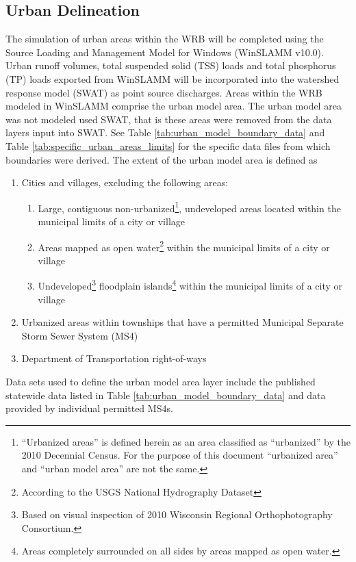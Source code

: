 \subsection{Urban Delineation}\label{sec:urban}
The simulation of urban areas within the WRB will be completed using the Source Loading and Management Model for Windows (WinSLAMM v10.0). Urban runoff volumes, total suspended solid (TSS) loads and total phosphorus (TP) loads exported from WinSLAMM will be incorporated into the watershed response model (SWAT) as point source discharges. Areas within the WRB modeled in WinSLAMM comprise the urban model area. The urban model area was not modeled used SWAT, that is these areas were removed from the data layers input into SWAT. See Table \ref{tab:urban_model_boundary_data} and Table \ref{tab:specific_urban_areas_limits} for the specific data files from which boundaries were derived. The extent of the urban model area is defined as 

\begin{enumerate}
	\item Cities and villages, excluding the following areas:
	\begin{enumerate}
		\item Large, contiguous non-urbanized\footnote{``Urbanized areas'' is defined herein as an area classified as ``urbanized'' by the 2010 Decennial Census. For the purpose of this document ``urbanized area'' and ``urban model area'' are not the same.}, undeveloped areas located within the municipal limits of a city or village
		\item Areas mapped as open water\footnote{According to the USGS National Hydrography Dataset} within the municipal limits of a city or village
		\item Undeveloped\footnote{Based on visual inspection of 2010 Wisconsin Regional Orthophotography Consortium.} floodplain islands\footnote{Areas completely surrounded on all sides by areas mapped as open water.} within the municipal limits of a city or village
	\end{enumerate}

	\item Urbanized areas within townships that have a permitted Municipal Separate Storm Sewer System (MS4)
	\item Department of Transportation right-of-ways
\end{enumerate}

Data sets used to define the urban model area layer include the published statewide data listed in Table \ref{tab:urban_model_boundary_data} and data provided by individual permitted MS4s.



